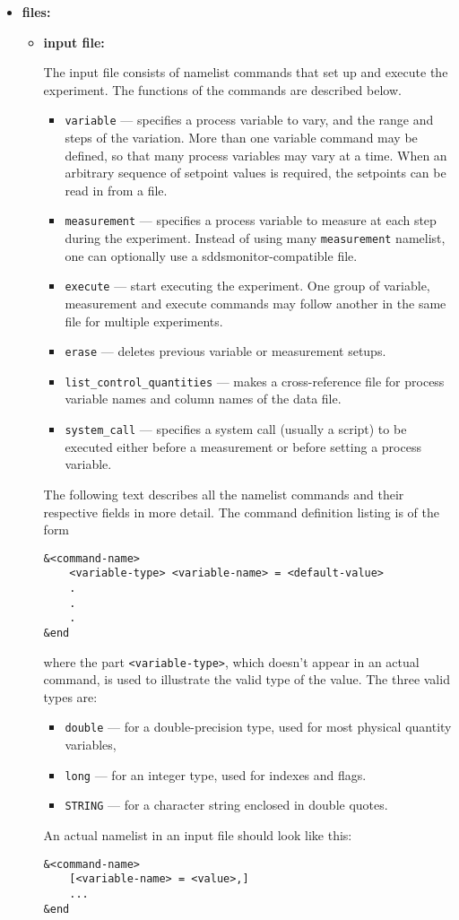 \begin{itemize}
\item {\bf files:}
\begin{itemize}
\item {\bf input file:}\par
The input file consists of namelist commands that set up and execute the experiment. The functions of the commands
are described below.
\begin{itemize}
        \item {\verb+variable+} --- specifies a process variable to vary, and the range and steps of the variation. More than one
                variable command may be defined, so that many process variables may vary at a time.
                When an arbitrary sequence of setpoint values is required, the setpoints can be read in 
                from a file.
        \item {\verb+measurement+} --- specifies a process variable to measure at each step during the experiment.
                Instead of using many {\verb+measurement+} namelist, 
                one can optionally use a sddsmonitor-compatible file.
        \item {\verb+execute+} --- start executing the experiment. One group of variable, measurement and execute commands
                may follow another in the same file for multiple experiments.
        \item {\verb+erase+} --- deletes previous variable or measurement setups.
        \item {\verb+list_control_quantities+} --- makes a cross-reference file for process variable names and column names of the data file.
        \item {\verb+system_call+} --- specifies a system call (usually a script) to be executed either before a measurement or before
                setting a process variable.
\end{itemize}

The following text describes all the namelist commands and their respective fields in more detail. 
The command definition listing is of the form
\begin{verbatim}
&<command-name>
    <variable-type> <variable-name> = <default-value>
    .
    .
    .
&end
\end{verbatim}
where the part \verb+<variable-type>+, which doesn't appear in an actual command, is used to illustrate
the valid type of the value. The three valid types are:
\begin{itemize}
\item \verb+double+ ---  for a double-precision type, used for most physical quantity variables,
\item \verb+long+ ---   for an integer type, used for indexes and flags.
\item \verb+STRING+ --- for a character string enclosed in double quotes.
\end{itemize}
An actual namelist in an input file should look like this:
\begin{verbatim}
&<command-name>
    [<variable-name> = <value>,]
    ...
&end
\end{verbatim}


\end{itemize}
\end{itemize}
